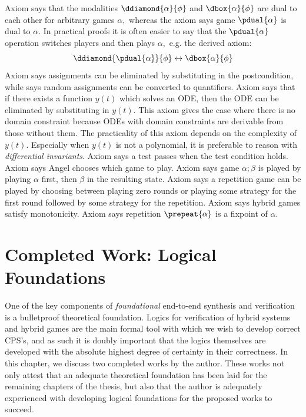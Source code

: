 \documentclass[12pt]{cmuthesis}
\theoremstyle{definition}
\theoremstyle{remark}
\newcommand{\lequiv}{\leftrightarrow}
\begin{document}
Axiom  says that the modalities $\ddiamond{\alpha}{\phi}$ and $\dbox{\alpha}{\phi}$ are dual to each other for arbitrary games $\alpha,$ whereas the axiom  says game 
$\pdual{\alpha}$ is dual to $\alpha$.
In practical proofs it is often easier to say that the $\pdual{\alpha}$ operation switches players and then plays $\alpha,$ e.g. the derived axiom:
\[\ddiamond{\pdual{\alpha}}{\phi} \lequiv \dbox{\alpha}{\phi}\]
Axiom  says assignments can be eliminated by substituting in the postcondition, while  says random assignments can be converted to quantifiers.
Axiom  says that if there exists a function $y(t)$ which solves an ODE, then the ODE can be eliminated by substituting in $y(t)$.
This axiom gives the case where there is no domain constraint because ODEs with domain constraints are derivable from those without them.
The practicality of this axiom depends on the complexity of $y(t)$. 
Especially when $y(t)$ is not a polynomial, it is preferable to reason with \emph{differential invariants}.
Axiom  says a test passes when the test condition holds.
Axiom  says Angel chooses which game to play.
Axiom  says game $\alpha;\beta$ is played by playing $\alpha$ first, then $\beta$ in the resulting state.
Axiom  says a repetition game can be played by choosing between playing zero rounds or playing some strategy for the first round followed by some strategy for the repetition.
Axiom  says hybrid games satisfy monotonicity.
Axiom  says repetition $\prepeat{\alpha}$ is a fixpoint of $\alpha$.

\chapter{Completed Work:  Logical Foundations}
\label{ch:logical-foundations}
One of the key components of \emph{foundational} end-to-end synthesis and verification is a bulletproof theoretical foundation.
Logics for verification of hybrid systems and hybrid games are the main formal tool with which we wish to develop correct CPS's, and as such it is doubly important that the logics themselves are developed with the absolute highest degree of certainty in their correctness.
In this chapter, we discuss two completed works by the author.
These works not only attest that an adequate theoretical foundation has been laid for the remaining chapters of the thesis, but also that the author is adequately experienced with developing logical foundations for the proposed works to succeed.
\end{document}
